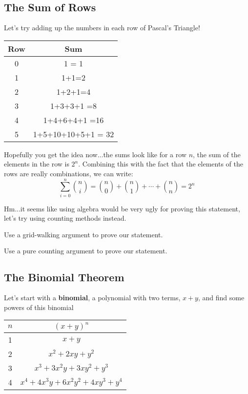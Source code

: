 \subsection{The Sum of Rows}
Let's try adding up the numbers in each row of Pascal's Triangle!

\begin{table}[H]
    \centering
    \begin{tabular}{c|c}
         Row & Sum \\
         \hline
         0 & 1 = 1\\
         1 & 1+1=2 \\
         2& 1+2+1=4 \\
         3& 1+3+3+1 =8 \\
         4 & 1+4+6+4+1 =16 \\
         5 & 1+5+10+10+5+1 = 32
    \end{tabular}
    \label{tab:sum}
\end{table}

Hopefully you get the idea now...the sums look like for a row $n$, the sum of the elements in the row is $2^n$. Combining this with the fact that the elements of the rows are really combinations, we can write:
$$\sum\limits_{i=0}^{n} \binom{n}{i} = \binom{n}{0}+\binom{n}{1}+\cdots+\binom{n}{n} = 2^n$$

Hm...it seems like using algebra would be very ugly for proving this statement, let's try using counting methods instead.

\begin{problem}
Use a grid-walking argument to prove our statement.
\end{problem}

\begin{problem}
Use a pure counting argument to prove our statement.
\end{problem}

\subsection{The Binomial Theorem}
Let's start with a \textbf{binomial}, a polynomial with two terms, $x+y$, and find some powers of this binomial
\begin{table}[H]
    \centering
    \begin{tabular}{c|c}
         $n$ & $(x+y)^n$ \\
         \hline
         1 & $x+y$ \\
         2 & $x^2+2xy+y^2$ \\
         3 & $x^3+3x^2y+3xy^2+y^3$ \\
         4 & $x^4+4x^3y+6x^2y^2+4xy^3+y^4$
    \end{tabular}
    \label{tab:binom}
\end{table}

